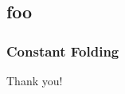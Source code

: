 \documentclass[aspectratio=169]{beamer}
\begin{document}







\subsection{foo}

\begin{frame}[fragile]
  \frametitle{Constant Folding}

\end{frame}


\begin{frame}[plain]
	\begin{center} Thank you! \end{center}
\end{frame}
\end{document}
